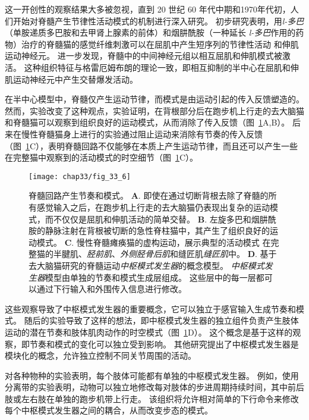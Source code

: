 这一开创性的观察结果大多被忽视，直到 20 世纪 60 年代中期和1970年代初，人们开始对脊髓产生节律性活动模式的机制进行深入研究。
初步研究表明，用\textit{l-多巴}（单胺递质多巴胺和去甲肾上腺素的前体）和烟肼酰胺（一种延长 \textit{l-多巴}作用的药物）治疗的脊髓猫的感觉纤维刺激可以在屈肌中产生短序列的节律性活动 和伸肌运动神经元。
进一步发现，脊髓中的中间神经元组以相互屈肌和伸肌模式被激活。
这种组织特征与格雷厄姆布朗的理论一致，即相互抑制的半中心在屈肌和伸肌运动神经元中产生交替爆发活动。


在半中心模型中，脊髓仅产生运动节律，而模式是由运动引起的传入反馈塑造的。
然而，实验改变了这种观点，实验证明，在背根部分后在跑步机上行走的去大脑猫和脊髓猫可以观察到组织良好的运动模式，从而消除了传入反馈（图~\ref{fig:33_6}A,B）。
后来在慢性脊髓猫身上进行的实验通过阻止运动来消除有节奏的传入反馈（图~\ref{fig:33_6}C），表明脊髓回路不仅能够在本质上产生运动节律，而且还可以产生一些在完整猫中观察到的活动模式的时空细节（图~\ref{fig:33_6}C）。


\begin{figure}[htbp]
	\centering
	\texttt{[image: chap33/fig\_33\_6]}
	\caption{脊髓回路产生节奏和模式。
	\textbf{A}. 即使在通过切断背根去除了脊髓的所有感觉输入之后，在跑步机上行走的去大脑猫仍表现出复杂的运动模式，而不仅仅是屈肌和伸肌活动的简单交替\cite{grillner1984effect}。
	\textbf{B}. 左旋多巴和烟肼酰胺的静脉注射在背根被切断的急性脊柱猫中，其产生了组织良好的运动模式\cite{grillner1979central}。
	\textbf{C}. 慢性脊髓瘫痪猫的虚构运动，展示典型的活动模式 在完整猫的半腱肌、\textit{胫前肌}、\textit{外侧胫骨后肌}和缝匠肌\textit{缝匠肌}中\cite{pearson1991fictive}。
	\textbf{D}. 基于去大脑猫研究的脊髓运动\textit{中枢模式发生器}的概念模型。
	\textit{中枢模式发生器}模型由单独的节奏和模式生成层组成。
	这些层中的每一层都可以通过下行输入和外围传入信息进行修改\cite{rybak2006modelling}。}
	\label{fig:33_6}
\end{figure}


这些观察导致了中枢模式发生器的重要概念，它可以独立于感官输入生成节奏和模式。
随后的实验导致了这样的想法，即中枢模式发生器的独立组件负责产生肢体运动的潜在节奏和肢体肌肉动作的时空模式（图~\ref{fig:33_6}D）。
这个概念是基于这样的观察，即节奏和模式的变化可以独立受到影响。
其他研究提出了中枢模式发生器是模块化的概念，允许独立控制不同关节周围的活动。


对各种物种的实验表明，每个肢体可能都有单独的中枢模式发生器。
例如，使用分离带的实验表明，动物可以独立地修改每对肢体的步进周期持续时间，其中前后肢或左右肢在单独的跑步机带上行走。
该组织将允许相对简单的下行命令来修改每个中枢模式发生器之间的耦合，从而改变步态的模式。


